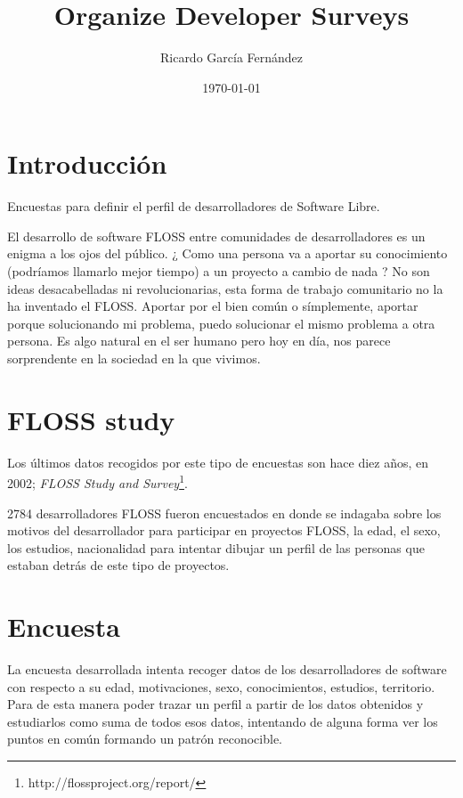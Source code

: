 \documentclass[11pt]{article}
\title{\textbf{Organize Developer Surveys}}
\author{Ricardo Garc\'ia Fern\'andez}
\date{\today}
\begin{document}
\maketitle

\section{Introducci\'on}

\par Encuestas para definir el perfil de desarrolladores de Software Libre.

\par El desarrollo de software FLOSS entre comunidades de desarrolladores es un enigma a los ojos del p\'ublico. ¿ Como una persona va a aportar su conocimiento (podr\'iamos llamarlo mejor tiempo) a un proyecto a cambio de nada ? No son ideas desacabelladas ni revolucionarias, esta forma de trabajo comunitario no la ha inventado el FLOSS. Aportar por el bien com\'un o s\'implemente, aportar porque solucionando mi problema, puedo solucionar el mismo problema a otra persona. Es algo natural en el ser humano pero hoy en d\'ia, nos parece sorprendente en la sociedad en la que vivimos.

\section{FLOSS study}

\par Los últimos datos recogidos por este tipo de encuestas son hace diez años, en 2002; \emph{FLOSS Study and Survey}\footnote{http://flossproject.org/report/}.

\par 2784 desarrolladores FLOSS fueron encuestados en donde se indagaba sobre los motivos del desarrollador para participar en proyectos FLOSS, la edad, el sexo, los estudios, nacionalidad para intentar dibujar un perfil de las personas que estaban detrás de este tipo de proyectos.

\section{Encuesta}

\par La encuesta desarrollada intenta recoger datos de los desarrolladores de software con respecto a su edad, motivaciones, sexo, conocimientos, estudios, territorio. Para de esta manera poder trazar un perfil a partir de los datos obtenidos y estudiarlos como suma de todos esos datos, intentando de alguna forma ver los puntos en com\'un formando un patr\'on reconocible.
\end{document}

